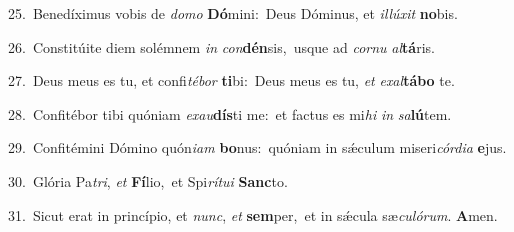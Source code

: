 {\numbfont\textcolor{\numbcolor}{25.}}~Benedíximus vobis de \textit{do}\-\textit{mo} \textbf{Dó}\-mini:~\star Deus Dóminus, et \textit{il}\-\textit{lú}\textit{xit} \textbf{no}\-bis.\par
{\numbfont\textcolor{\numbcolor}{26.}}~Constitúite diem solémnem \textit{in} \textit{con}\-\textbf{dén}sis,~\star usque ad \textit{cor}\-\textit{nu} \textit{al}\-\textbf{tá}ris.\par
{\numbfont\textcolor{\numbcolor}{27.}}~Deus meus es tu, et confi\-\textit{té}\-\textit{bor} \textbf{ti}\-bi:~\star Deus meus es tu, \textit{et} \textit{ex}\-\textit{al}\textbf{tá}\textbf{bo} te.\par
{\numbfont\textcolor{\numbcolor}{28.}}~Confitébor tibi quóniam \textit{ex}\-\textit{au}\textbf{dís}ti me:~\star et factus es mi\textit{hi} \textit{in} \textit{sa}\-\textbf{lú}tem.\par
{\numbfont\textcolor{\numbcolor}{29.}}~Confitémini Dómino quón\-\textit{i}\-\textit{am} \textbf{bo}\-nus:~\star quóniam in sǽculum miseri\-\textit{cór}\-\textit{di}\textit{a} \textbf{e}\-jus.\par
{\numbfont\textcolor{\numbcolor}{30.}}~Glória Pa\-\textit{tri}\-, \textit{et} \textbf{Fí}\-lio,~\star et Spi\-\textit{rí}\-\textit{tu}\textit{i} \textbf{Sanc}\-to.\par
{\numbfont\textcolor{\numbcolor}{31.}}~Sicut erat in princípio, et \textit{nunc}\-, \textit{et} \textbf{sem}\-per,~\star et in sǽcula sæ\-\textit{cu}\-\textit{ló}\textit{rum}. \textbf{A}\-men.\par
